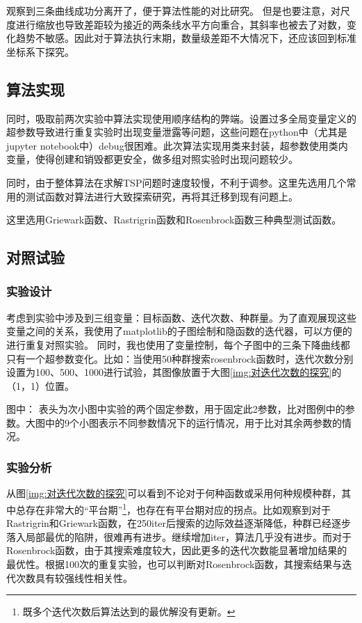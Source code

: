 \documentclass[lang=cn,11pt]{elegantpaper}
\begin{document}
观察到三条曲线成功分离开了，便于算法性能的对比研究。
但是也要注意，对尺度进行缩放也导致差距较为接近的两条线水平方向重合，其斜率也被去了对数，变化趋势不敏感。因此对于算法执行末期，数量级差距不大情况下，还应该回到标准坐标系下探究。


\subsection{算法实现}
同时，吸取前两次实验中算法实现使用顺序结构的弊端。设置过多全局变量定义的超参数导致进行重复实验时出现变量泄露等问题，这些问题在python中（尤其是jupyter notebook中）debug很困难。此次算法实现用类来封装，超参数使用类内变量，使得创建和销毁都更安全，做多组对照实验时出现问题较少。

同时，由于整体算法在求解TSP问题时速度较慢，不利于调参。这里先选用几个常用的测试函数对算法进行大致探索研究，再将其迁移到现有问题上。

这里选用Griewark函数、Rastrigrin函数和Rosenbrock函数三种典型测试函数。

\subsection{对照试验}
\subsubsection{实验设计}
考虑到实验中涉及到三组变量：目标函数、迭代次数、种群量。为了直观展现这些变量之间的关系，我使用了matplotlib的子图绘制和隐函数的迭代器，可以方便的进行重复对照实验。
同时，我也使用了变量控制，每个子图中的三条下降曲线都只有一个超参数变化。比如：当使用50种群搜索rosenbrock函数时，迭代次数分别设置为100、500、1000进行试验，其图像放置于大图\ref{img:对迭代次数的探究}的（1，1）位置。

图中：
表头为次小图中实验的两个固定参数，用于固定此2参数，比对图例中的参数。大图中的9个小图表示不同参数情况下的运行情况，用于比对其余两参数的情况。

\subsubsection{实验分析}
从图\ref{img:对迭代次数的探究}可以看到不论对于何种函数或采用何种规模种群，其中总存在非常大的“平台期”\footnote{既多个迭代次数后算法达到的最优解没有更新。}，也存在有平台期对应的拐点。比如观察到对于Rastrigrin和Griewark函数，在250iter后搜索的边际效益逐渐降低，种群已经逐步落入局部最优的陷阱，很难再有进步。继续增加iter，算法几乎没有进步。而对于Rosenbrock函数，由于其搜索难度较大，因此更多的迭代次数能显著增加结果的最优性。根据100次的重复实验，也可以判断对Rosenbrock函数，其搜索结果与迭代次数具有较强线性相关性。
\end{document}
